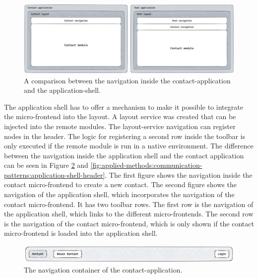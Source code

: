 \ifshowImages
  \begin{figure}[H]
  \centering
  \includegraphics[width=1\linewidth]{images/applied-methods/communication-patterns/layout-comparison.jpg}
  \caption{A comparison between the navigation inside the contact-application and the application-shell.}\label{fig:applied-methods:communication-patterns:comparison-between-host-and-contact-layout}
  \end{figure}
\fi

\noindent The application shell has to offer a mechanism to make it possible to integrate the micro-frontend into the layout. A layout service was created that can be injected into the remote modules. The layout-service navigation can register nodes in the header. The logic for registering a second row inside the toolbar is only executed if the remote module is run in a native environment. The difference between the navigation inside the application shell and the contact application can be seen in Figure \ref{fig:applied-methods:communication-patterns:contact-application-header} and \ref{fig:applied-methods:communication-patterns:application-shell-header}. The first figure shows the navigation inside the contact micro-frontend to create a new contact. The second figure shows the navigation of the application shell, which incorporates the navigation of the contact micro-frontend. It has two toolbar rows. The first row is the navigation of the application shell, which links to the different micro-frontends. The second row is the navigation of the contact micro-frontend, which is only shown if the contact micro-frontend is loaded into the application shell.

\ifshowImages
  \begin{figure}[H]
  \centering
  \includegraphics[width=1\linewidth]{images/applied-methods/communication-patterns/contact-header.png}
  \caption{The navigation container of the contact-application.}\label{fig:applied-methods:communication-patterns:contact-application-header}
  \end{figure}
\fi

